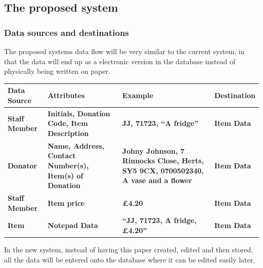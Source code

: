 \subsection{The proposed system}

\subsubsection{Data sources and destinations}
The proposed systems data flow will be very similar to the current system, in that the data will end up as a electronic version in the database instead of physically being written on paper.

\begin{tabular}{|p{3cm}|p{4cm}|p{4cm}|p{2cm}|}
	\hline
	\textbf{Data Source} & \textbf{Attributes} & \textbf{Example} & \textbf{Destination}\\ \hline 
	\textbf{Staff Member} & \textbf{Initials, Donation Code, Item Description} & \textbf{JJ, 71723, “A fridge”} & \textbf{Item Data}\\ \hline
	\textbf{Donator} & \textbf{Name, Address, Contact Number(s), Item(s) of Donation} & \textbf{Johny Johnson, 7 Rinnocks Close, Herts, SY5 9CX, 0700502340, A vase and a flower} & \textbf{Item Data} \\ \hline
	\textbf{Staff Member} & \textbf{Item price} & \textbf{£4.20} & \textbf{Item Data} \\ \hline
	\textbf{Item} & \textbf{Notepad Data} & \textbf{“JJ, 71723, A fridge, £4.20”} & \textbf{Item Data} \\ \hline
\end{tabular}

In the new system, instead of having this paper created, edited and then stored, all the data will be entered onto the database where it can be edited easily later.
 
